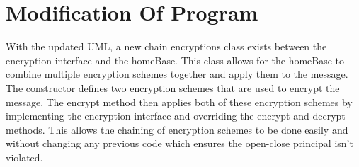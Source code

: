 \documentclass[12pt]{article}
\begin{document}
    \section*{Modification Of Program}
        With the updated UML, a new chain encryptions class exists between the encryption interface and the homeBase. This class allows
        for the homeBase to combine multiple encryption schemes together and apply them to the message. The constructor defines
        two encryption schemes that are used to encrypt the message. The encrypt method then applies both of these encryption schemes
        by implementing the encryption interface and overriding the encrypt and decrypt methods. This allows the chaining of 
        encryption schemes to be done easily and without changing any previous code which ensures the open-close
        principal isn't violated.
    
    
\end{document}
